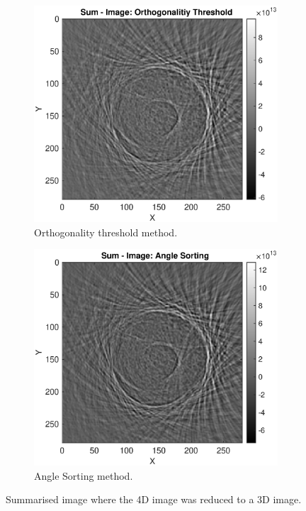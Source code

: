 \begin{figure}[H]
     \centering
     \begin{subfigure}[b]{0.45\textwidth}
         \centering
         \includegraphics[width=1.12\linewidth]{Graphics/Results/Diff_angle_sort_orthogonality/diff_ortho_bubble_sumImmage_ortho.eps}
         \caption{Orthogonality threshold method.}
         \label{fig:res:summareized_bubble_ortho_image_ortho}
     \end{subfigure}
     \hfill
     \begin{subfigure}[b]{0.45\textwidth}
         \centering
         \includegraphics[width=1.12\textwidth]{Graphics/Results/Diff_angle_sort_orthogonality/diff_ortho_bubble_sumImmage_sort.eps}
         \caption{Angle Sorting method.}
         \label{fig:res:summareized_bubble_ortho_image_bubble}
     \end{subfigure}
        \caption{Summarised image where the 4D image was reduced to a 3D image. }
        \label{fig:res:summareized_bubble_ortho_image}
\end{figure}

